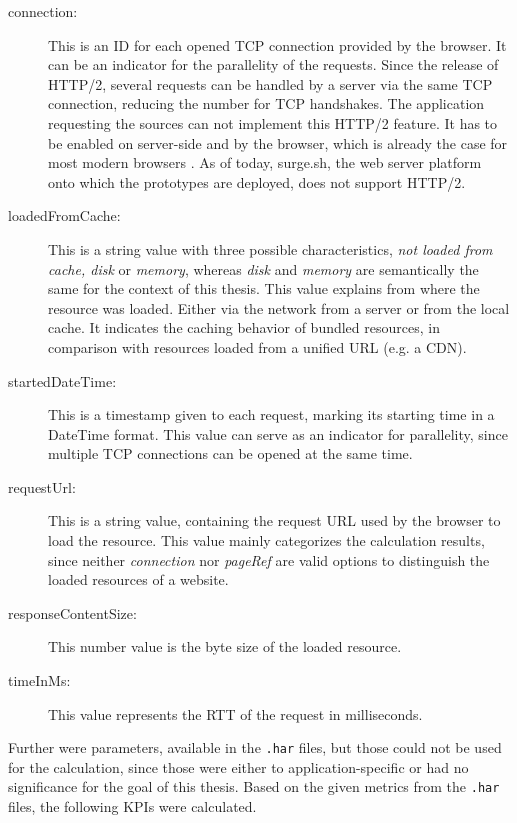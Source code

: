 \begin{description}
	\item[connection:] This is an ID for each opened TCP connection provided by the browser. It can be an indicator for the parallelity of the requests. Since the release of HTTP/2, several requests can be handled by a server via the same TCP connection, reducing the number for TCP handshakes. The application requesting the sources can not implement this HTTP/2 feature. It has to be enabled on server-side and by the browser, which is already the case for most modern browsers \cite{http2}. As of today, surge.sh, the web server platform onto which the prototypes are deployed, does not support HTTP/2.
	
	\item[loadedFromCache:] This is a string value with three possible characteristics, \textit{not loaded from cache, disk} or \textit{memory}, whereas \textit{disk} and \textit{memory} are semantically the same for the context of this thesis. This value explains from where the resource was loaded. Either via the network from a server or from the local cache. It indicates the caching behavior of bundled resources, in comparison with resources loaded from a unified URL (e.g. a CDN). 
	
	\item[startedDateTime:] This is a timestamp given to each request, marking its starting time in a DateTime format. This value can serve as an indicator for parallelity, since multiple TCP connections can be opened at the same time. 
	
	\item[requestUrl:] This is a string value, containing the request URL used by the browser to load the resource. This value mainly categorizes the calculation results, since neither \textit{connection} nor \textit{pageRef} are valid options to distinguish the loaded resources of a website. 
	
	\item[responseContentSize:] This number value is the byte size of the loaded resource.
	
	\item[timeInMs:] This value represents the RTT of the request in milliseconds. 
\end{description}

Further were parameters, available in the \texttt{.har} files, but those could not be used for the calculation, since those were either to application-specific or had no significance for the goal of this thesis.
Based on the given metrics from the \texttt{.har} files, the following KPIs were calculated.

